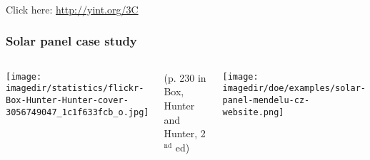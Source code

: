 \documentclass[handout,11pt,aspectratio=169,mathserif]{beamer}
\begin{document}
{
\begin{frame}\frametitle{}
\end{frame}}

{
\begin{frame}\frametitle{}
	\vfill
	\vspace{72pt}
	Click here: \href{http://yint.org/3C}{http://yint.org/3C}
\end{frame}}





\begin{frame}\frametitle{Solar panel case study}
	
	\begin{columns}[T]
			\texttt{[image: \\imagedir/statistics/flickr-Box-Hunter-Hunter-cover-3056749047\_1c1f633fcb\_o.jpg]}
			
			{\scriptsize (p. 230 in Box, Hunter and Hunter, 2$^\text{nd}$ ed)}
			
			\texttt{[image: \\imagedir/doe/examples/solar-panel-mendelu-cz-website.png]}
			
			
	\end{columns}
\end{frame}
\end{document}
